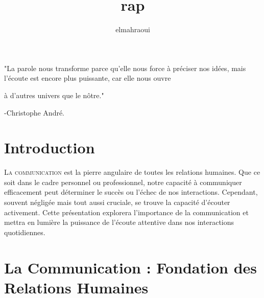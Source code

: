 \documentclass[a4paper, 11pt, oneside]{book}
\title{rap}  %
\author{elmahraoui}  %
\newenvironment{dedication}
  {\clearpage           %
   \thispagestyle{empty}%
   \vspace*{\stretch{1}}%
   \itshape             %
   \raggedleft          %
  }
  {\par %
   \vspace{\stretch{3}} %
   \clearpage           %
  }
\begin{document}
\begin{dedication}

"La parole nous transforme parce qu'elle nous force à préciser nos idées, mais l'écoute est encore plus puissante, car elle nous ouvre \par
à d'autres univers que le nôtre."\par
                           -Christophe André.

\end{dedication}






\tableofcontents

\clearpage
\sloppy
{}


\frenchspacing  %



\chapter{Introduction}\label{ch:intro}

\vspace{10mm}

 \vspace{5mm}
 
\lettrine[lines=2, depth=0, lraise=-0.1, findent=0.3em, nindent=0.3em]{\color{BrickRed}\fontsize{50pt}{72pt}L}{a communication}  est la pierre angulaire de toutes les relations humaines. Que ce soit dans le cadre personnel ou professionnel, notre capacité à communiquer efficacement peut déterminer le succès ou l'échec de nos interactions. Cependant, souvent négligée mais tout aussi cruciale, se trouve la capacité d'écouter activement. Cette présentation explorera l'importance de la communication et mettra en lumière la puissance de l'écoute attentive dans nos interactions quotidiennes. 

\chapter{La Communication : Fondation des Relations Humaines }\label{ch:1}
\end{document}
